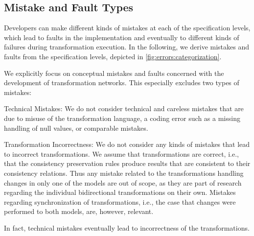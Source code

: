 \subsection{Mistake and Fault Types}
\label{chap:errors:categorization:mistakes}



Developers can make different kinds of mistakes at each of the specification levels, which lead to faults in the implementation and eventually to different kinds of failures during transformation execution.
In the following, we derive mistakes and faults from the specification levels, depicted in \autoref{fig:errors:categorization}.

We explicitly focus on conceptual mistakes and faults concerned with the development of transformation networks.
This especially excludes two types of mistakes:
\begin{properdescription}
    \item[Technical Mistakes:] We do not consider technical and careless mistakes that are due to misuse of the transformation language, a coding error such as a missing handling of null values, or comparable mistakes.
    \item[Transformation Incorrectness:] We do not consider any kinds of mistakes that lead to incorrect transformations. We assume that transformations are correct, i.e., that the consistency preservation rules produce results that are consistent to their consistency relations. Thus any mistake related to the transformations handling changes in only one of the models are out of scope, as they are part of research regarding the individual bidirectional transformations on their own. Mistakes regarding synchronization of transformations, i.e., the case that changes were performed to both models, are, however, relevant.
\end{properdescription}
In fact, technical mistakes eventually lead to incorrectness of the transformations.


